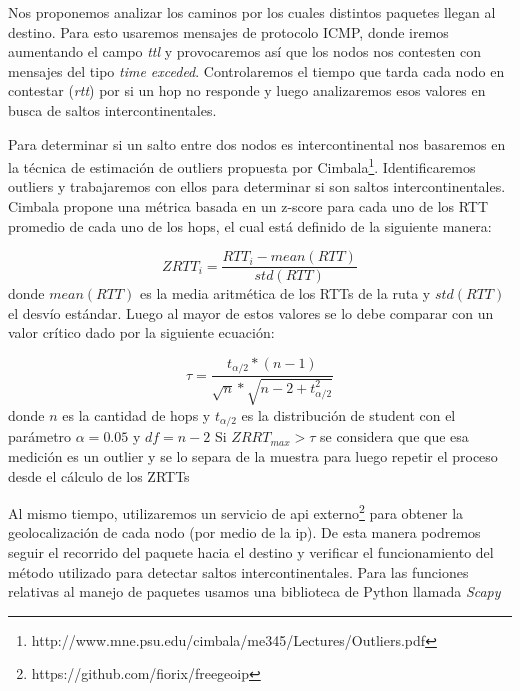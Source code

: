 \par Nos proponemos analizar los caminos por los cuales distintos paquetes llegan al destino. Para esto usaremos mensajes de protocolo ICMP, donde iremos aumentando el campo \textit{ttl} y provocaremos así que los nodos nos contesten con mensajes del tipo \textit{time exceded}. Controlaremos el tiempo que tarda cada nodo en contestar (\textit{rtt}) por si un hop no responde y luego analizaremos esos valores en busca de saltos intercontinentales.

\par Para determinar si un salto entre dos nodos es intercontinental nos basaremos en la técnica de estimación de outliers propuesta por Cimbala\footnote{http://www.mne.psu.edu/cimbala/me345/Lectures/Outliers.pdf}. Identificaremos outliers y trabajaremos con ellos para determinar si son saltos intercontinentales.
Cimbala propone una métrica basada en un z-score para cada uno de los RTT promedio de cada uno de los hops, el cual está definido de la siguiente manera:

\begin{equation}
    ZRTT_i = \frac{RTT_i-mean(RTT)}{std(RTT)}
\end{equation}
donde $mean(RTT)$ es la media aritmética de los RTTs de la ruta y $std(RTT)$ el desvío estándar.
Luego al mayor de estos valores se lo debe comparar con un valor crítico dado por la siguiente ecuación:

\begin{equation}
    \tau = \frac{t_{\alpha/2}*(n-1)}{\sqrt{n}*\sqrt{n-2+t_{\alpha/2}^{2}}}
\end{equation}
donde $n$ es la cantidad de hops y $t_{\alpha/2}$ es la distribución de student con el parámetro $\alpha=0.05$ y $df =  n-2$
Si $ZRRT_{max} > \tau$ se considera que que esa medición es un outlier y se lo separa de la muestra para luego repetir el proceso desde el cálculo de los ZRTTs
\par Al mismo tiempo, utilizaremos un servicio de api externo\footnote{https://github.com/fiorix/freegeoip} para obtener la geolocalización de cada nodo (por medio de la ip). De esta manera podremos seguir el recorrido del paquete hacia el destino y verificar el funcionamiento del método utilizado para detectar saltos intercontinentales. Para las funciones relativas al manejo de paquetes usamos una biblioteca de Python llamada \emph{Scapy}
